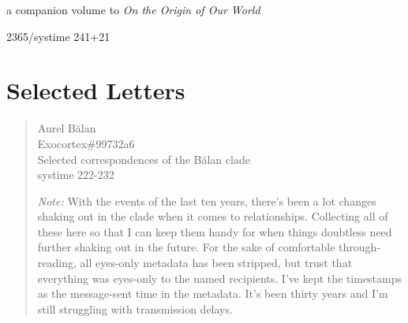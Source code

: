 \documentclass[11pt]{memoir}
\begin{document}
  a companion volume to \emph{On the Origin of Our World}

  2365/systime 241+21
  
  \vfill

  \part*{Selected Letters}

  \begin{quote}
    Aurel Bălan \\
    Exocortex\#99732a6 \\
    Selected correspondences of the Bălan clade \\
    systime 222-232
    
    \emph{Note:} With the events of the last ten years, there's been a lot changes shaking out in the clade when it comes to relationships. Collecting all of these here so that I can keep them handy for when things doubtless need further shaking out in the future. For the sake of comfortable through-reading, all eyes-only metadata has been stripped, but trust that everything was eyes-only to the named recipients. I've kept the timestamps as the message-sent time in the metadata. It's been thirty years and I'm still struggling with transmission delays.
  \end{quote}

  \cleardoublepage

  
  \newpage
  
  \newpage
  
  \newpage
  
  \newpage
  
  \newpage
  
  \newpage
  
  \newpage
  
  \newpage
  
  \newpage
  
  \newpage
  
  \newpage
  
  \newpage
  
  \newpage
  
  \newpage
  
  \newpage
  
  \newpage
  
  \newpage
  
  \newpage
  
  \newpage
  

  \backmatter

  \markboth{}{}

  

  
\end{document}
